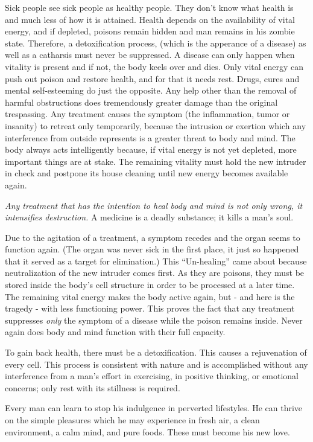 \documentclass[12pt,letterpaper]{article}
\begin{document}
Sick people see sick people as healthy people. They don't know what
health is and much less of how it is attained. Health depends on the
availability of vital energy, and if depleted, poisons remain hidden
and man remains in his zombie state. Therefore, a detoxification
process, (which is the apperance of a disease) as well as a catharsis
must never be suppressed. A disease can only happen when vitality is
present and if not, the body keels over and dies. Only vital energy
can push out poison and restore health, and for that it needs
rest. Drugs, cures and mental self-esteeming do just the opposite. Any
help other than the removal of harmful obstructions does tremendously
greater damage than the original trespassing. Any treatment causes the
symptom (the inflammation, tumor or insanity) to retreat only
temporarily, because the intrusion or exertion which any interference
from outside represents is a greater threat to body and mind. The body
always acts intelligently because, if vital energy is not yet
depleted, more important things are at stake. The remaining vitality
must hold the new intruder in check and postpone its house cleaning
until new energy becomes available again.

\emph{Any treatment that has the intention to heal body and mind is
not only wrong, it intensifies destruction.} A medicine is a deadly
substance; it kills a man's soul.

Due to the agitation of a treatment, a symptom recedes and the organ
seems to function again. (The organ was never sick in the first place,
it just so happened that it served as a target for elimination.) This
``Un-healing'' came about because neutralization of the new intruder
comes first. As they are poisons, they must be stored inside the
body's cell structure in order to be processed at a later time. The
remaining vital energy makes the body active again, but - and here is
the tragedy - with less functioning power. This proves the fact that
any treatment suppresses \emph{only} the symptom of a disease while
the poison remains inside. Never again does body and mind function
with their full capacity.

To gain back health, there must be a detoxification. This causes a
rejuvenation of every cell. This process is consistent with nature and
is accomplished without any interference from a man's effort in
exercising, in positive thinking, or emotional concerns; only rest
with its stillness is required.

Every man can learn to stop his indulgence in perverted lifestyles. He
can thrive on the simple pleasures which he may experience in fresh
air, a clean environment, a calm mind, and pure foods. These must
become his new love.
\end{document}
